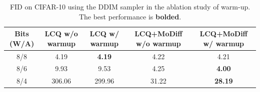 \begin{table}[h!]
\centering
\caption{FID on CIFAR-10 using the DDIM sampler in the ablation study of warm-up. The best performance is \textbf{bolded}.}
\begin{tabular}{c|c|c|c|c}
\toprule
{Bits (W/A)} & LCQ w/o warmup & LCQ w/ warmup & LCQ+MoDiff w/o warmup & LCQ+MoDiff w/ warmup \\
\midrule
{8/8} & 4.19 & \bf 4.19 & 4.22 & 4.21 \\
\midrule
{8/6} & 9.93 & 9.53 & 4.25 & \bf 4.00 \\
\midrule
{8/4} & 306.06 & 299.96 & 31.22 & \bf 28.19 \\
\bottomrule
\end{tabular}
\label{tab:warmup}
\end{table}